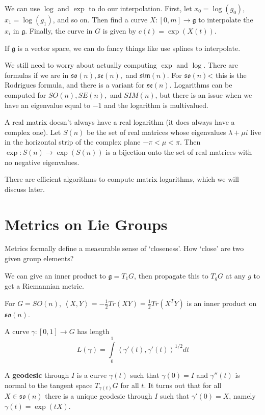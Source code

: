 We can use $\log$ and $\exp$ to do our interpolation.  First, let $x_0=\log(g_0)$, $x_1=\log(g_1)$, and so on.   Then find a curve $X:[0,m]\rightarrow\mathfrak{g}$ to interpolate the $x_i$ in $\mathfrak{g}$.  Finally, the curve in $G$ is given by $c(t)=\exp(X(t))$.

If $\mathfrak{g}$ is a vector space, we can do fancy things like use splines to interpolate.

We still need to worry about actually computing $\exp$ and $\log$.  There are formulas if we are in $\mathfrak{so}(n),\mathfrak{se}(n),$ and $\mathfrak{sim}(n)$.  For $\mathfrak{so}(n)$< this is the Rodrigues formula, and there is a variant for $\mathfrak{se}(n)$.  Logarithms can be computed for $SO(n),SE(n),$ and $SIM(n)$, but there is an issue when we have an eigenvalue equal to $-1$ and the logarithm is multivalued.

A real matrix doesn't always have a real logarithm (it does always have  a complex one).  Let $S(n)$ be the set of real matrices whose eigenvalues $\lambda + \mu i$ live in the horizontal strip of the complex plane $-\pi <\mu <\pi$.  Then $\exp: S(n)\rightarrow \exp(S(n))$ is a bijection onto the set of real matrices with no negative eigenvalues.

There are efficient algorithms to compute matrix logarithms, which we will discuss later.


\section*{Metrics on Lie Groups}

Metrics formally define a measurable sense of `closeness'.  How `close' are two given group elements?

We can give an inner product to $\mathfrak{g}=T_1G$, then propagate this to $T_gG$ at any $g$ to get a Riemannian metric.

For $G=SO(n)$, $\left\langle X,Y \right\rangle = -\frac{1}{2}Tr(XY)= \frac{1}{2}Tr(X^TY)$ is an inner product on $\mathfrak{so}(n)$.

A curve $\gamma:[0,1]\rightarrow G$ has length
$$L(\gamma)=\int\limits_0^1 \left\langle \gamma'(t),\gamma'(t) \right\rangle^{1/2}dt$$

A \textbf{geodesic} through $I$ is a curve $\gamma(t)$ such that $\gamma(0)=I$ and $\gamma''(t)$ is normal to the tangent space $T_{\gamma(t)}G$ for all $t$.  It turns out that for all $X\in\mathfrak{so}(n)$ there is a unique geodesic through $I$ such that $\gamma'(0)=X$, namely $\gamma(t)=\exp(tX)$.

